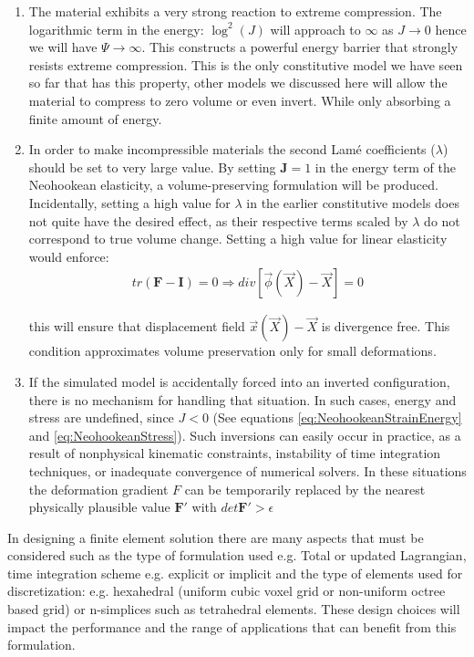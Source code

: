 \begin{enumerate}
 \item The material exhibits a very strong reaction to extreme compression. The logarithmic term in the energy: $\log^2(J)$ will approach 
 to $\infty$ as $J \rightarrow 0$ hence we will have $\Psi \rightarrow \infty$. This constructs a powerful energy barrier that strongly
 resists extreme compression. This is the only constitutive model we have seen so far that has this property, other models we discussed here
 will allow the material to compress to zero volume or even invert. While only absorbing a finite amount of energy.
 
 \item In order to make incompressible materials the second Lam\'e coefficients ($\lambda$) should be set to very large value. By setting 
 $\boldsymbol{J}=1$ in the energy term of the Neohookean elasticity, a volume-preserving formulation will be produced. Incidentally, setting a
 high value for $\lambda$ in the earlier constitutive models does not quite have the desired effect, as their respective terms scaled by $\lambda$
 do not correspond to true volume change. Setting a high value for linear elasticity would enforce:
\begin{gather*}
  tr(\boldsymbol{F}-\boldsymbol{I})=0 \Rightarrow div\left[\vec{\phi}(\vec{X})-\vec{X}\right] = 0
\end{gather*}

this will ensure that displacement field $\vec{x}(\vec{X})-\vec{X}$ is divergence free. This condition approximates volume preservation only
for small deformations.

\item If the simulated model is accidentally forced into an inverted configuration, there is no mechanism for handling that situation.  
In such cases, energy and stress are undefined, since $J <0$ (See equations \ref{eq:NeohookeanStrainEnergy} and \ref{eq:NeohookeanStress}).
Such inversions can easily occur in practice, as a result of nonphysical kinematic constraints, instability of time integration techniques,
or inadequate convergence of numerical solvers. In these situations the deformation gradient $F$ can be temporarily replaced by the nearest
physically plausible value $\boldsymbol{F'}$ with $det\boldsymbol{F'} > \epsilon$
\end{enumerate}

In designing a finite element solution there are many aspects that must be considered such as the type of formulation used e.g.
Total or updated Lagrangian, time integration scheme e.g. explicit or implicit and the type of elements used for discretization:
e.g. hexahedral (uniform cubic voxel grid or non-uniform octree based grid) or n-simplices such as tetrahedral elements. 
These design choices will impact the performance and the range of applications that can benefit from this formulation.

\setlength{\unitlength}{\savedunitlength}

